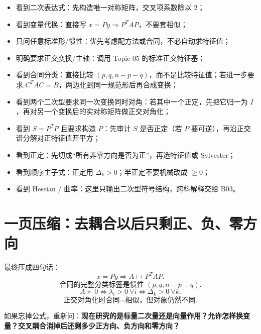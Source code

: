 \documentclass[11pt,a4paper]{ctexart}
\newcommand{\kw}[1]{\textbf{\color{deep}#1}}
\begin{document}
\begin{itemize}
  \item 看到二次表达式：先构造唯一对称矩阵，交叉项系数除以 $2$；
  \item 看到变量代换：直接写 $x=Py\Rightarrow P^TAP$，不要套相似；
  \item 只问任意标准形/惯性：优先考虑配方法或合同，不必自动求特征值；
  \item 明确要求正交变换/主轴：调用 Topic 05 的标准正交特征基；
  \item 看到合同分类：直接比较 $(p,q,n-p-q)$，而不是比较特征值；若进一步要求 $C^TAC=B$，两边化到同一规范形后再合成变换；
  \item 看到两个二次型要求同一次变换同时对角：若其中一个正定，先把它归一为 $I$，再对另一个变换后的实对称矩阵做正交对角化；
  \item 看到 $S=P^TP$ 且要求构造 $P$：先审计 $S$ 是否正定（若 $P$ 要可逆），再沿正交谱分解对正特征值开平方；
  \item 看到正定：先切成“所有非零方向是否为正”，再选特征值或 Sylvester；
  \item 看到顺序主子式：正定用 $\Delta_k>0$；半正定不要机械改成 $\ge0$；
  \item 看到 Hessian / 曲率：这里只输出二次型符号结构，跨科解释交给 B03。
\end{itemize}

\section{一页压缩：去耦合以后只剩正、负、零方向}

\begin{center}
\end{center}

最终压成四句话：
\[
\boxed{x=Py\Longrightarrow A\mapsto P^TAP.}
\]
\[
\boxed{\text{合同的完整分类标签是惯性 }(p,q,n-p-q).}
\]
\[
\boxed{A\succ0\iff\lambda_i>0\ \forall i\iff\Delta_k>0\ \forall k.}
\]
\[
\boxed{\text{正交对角化时合同=相似，但对象仍然不同}.}
\]

如果忘掉公式，重新问：\kw{现在研究的是标量二次量还是向量作用？允许怎样换变量？交叉耦合消掉后还剩多少正方向、负方向和零方向？}
\end{document}
